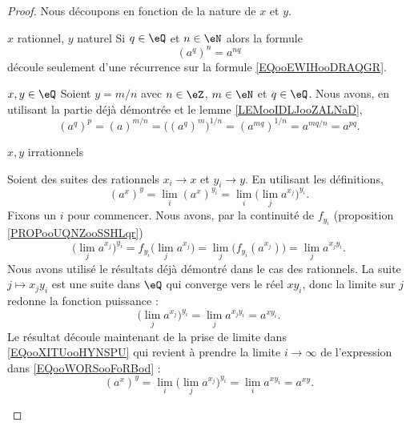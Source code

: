 \begin{proof}
    Nous découpons en fonction de la nature de \( x\) et \( y\). 

    \begin{subproof}
        \item[\( x\) rationnel, \( y\) naturel]
            Si \( q\in \eQ\) et \( n\in \eN\) alors la formule
            \begin{equation}
                (a^q)^n=a^{nq}
            \end{equation}
            découle seulement d'une récurrence sur la formule \ref{EQooEWIHooDRAQGR}.

        \item[ \( x,y\in \eQ\)]
            Soient \( y=m/n\) avec \( n\in \eZ\), \( m\in \eN\) et \( q\in \eQ\). Nous avons, en utilisant la partie déjà démontrée et le lemme \ref{LEMooIDLJooZALNaD},
            \begin{equation}
                (a^q)^{p}=(a)^{m/n}=\big( (a^q)^m \big)^{1/n}=(a^{mq})^{1/n}=a^{mq/n}=a^{pq}.
            \end{equation}
        \item[\( x,y\) irrationnels]

            Soient des suites des rationnels \( x_i\to x\) et \( y_i\to y\). En utilisant les définitions,
            \begin{equation}        \label{EQooXITUooHYNSPU}
                (a^x)^y=\lim_i(a^x)^{y_i}=\lim_i\big( \lim_j a^{x_j} \big)^{y_i}.
            \end{equation}
            Fixons un \(i\) pour commencer. Nous avons, par la continuité de \( f_{y_i}\) (proposition \ref{PROPooUQNZooSSHLqr})
            \begin{equation}
                \big( \lim_ja^{x_j} \big)^{y_i}=f_{y_i}\big( \lim_ja^{x_j} \big)=\lim_j\big( f_{y_i}(a^{x_j}) \big)=\lim_ja^{x_jy_i}.
            \end{equation}
            Nous avons utilisé le résultats déjà démontré dans le cas des rationnels. La suite \( j\mapsto x_jy_i\) est une suite dans \( \eQ\) qui converge vers le réel \( xy_i\), donc la limite sur \( j\) redonne la fonction puissance :
            \begin{equation}        \label{EQooWORSooFoRBod}
                \big( \lim_ja^{x_j} \big)^{y_i}=\lim_ja^{x_jy_i}=a^{xy_i}.
            \end{equation}
            Le résultat découle maintenant de la prise de limite dans \eqref{EQooXITUooHYNSPU} qui revient à prendre la limite \( i\to \infty\) de l'expression dans \eqref{EQooWORSooFoRBod} :
            \begin{equation}
                (a^x)^y=\lim_i\big( \lim_j a^{x_j} \big)^{y_i}=\lim_ia^{xy_i}=a^{xy}.
            \end{equation}
    \end{subproof}
\end{proof}

